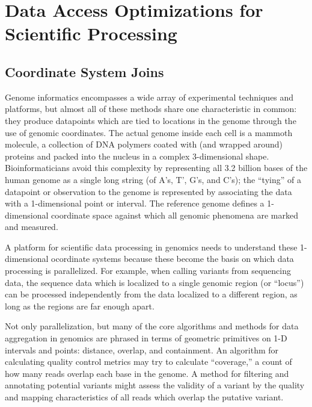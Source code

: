 \documentclass{acm_proc_article-sp}
\begin{document}
\section{Data Access Optimizations for \\ Scientific Processing}
\label{sec:optimizations-scientific-processing}

\subsection{Coordinate System Joins}
\label{sec:coordinate-system-joins}

Genome informatics encompasses a wide array of experimental techniques and platforms, but almost all of these methods share one characteristic in common: they produce datapoints which are tied to locations in the genome through the use of genomic coordinates. The actual genome inside each cell is a mammoth molecule, a collection of DNA polymers coated with (and wrapped around) proteins and packed into the nucleus in a complex 3-dimensional shape. Bioinformaticians avoid this complexity by representing all 3.2 billion bases of the human genome as a single long string (of A's, T', G's, and C's); the ``tying'' of a datapoint or observation to the genome is represented by associating the data with a 1-dimensional point or interval. The reference genome defines a 1-dimensional coordinate space against which all genomic phenomena are marked and measured.

A platform for scientific data processing in genomics needs to understand these 1-dimensional ocordinate systems because these become the basis on which data processing is parallelized. 
For example, when calling variants from sequencing data, the sequence data which is localized to a single genomic region (or ``locus'') can be processed independently from the data localized to a different region, as long as the regions are far enough apart.

Not only parallelization, but many of the core algorithms and methods for data aggregation in genomics are phrased in terms of geometric primitives on 1-D intervals and points: distance, overlap, and containment.  
An algorithm for calculating quality control metrics may try to calculate ``coverage,'' a count of how many reads overlap each base in the genome.  
A method for filtering and annotating potential variants might assess the validity of a variant by the quality and mapping characteristics of all reads which overlap the putative variant.
\end{document}
